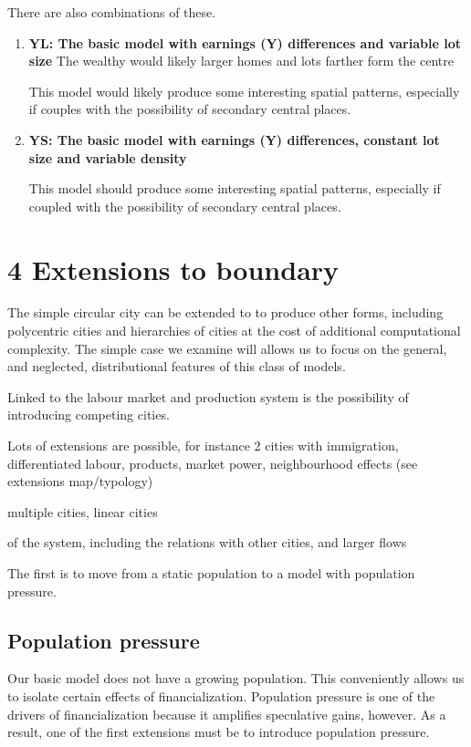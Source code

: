 There are also combinations of these.

\begin{enumerate}

\item \textbf{YL: The basic model with earnings (Y) differences and variable lot size}
The wealthy would likely larger homes and lots farther form the centre

This model would likely produce some interesting spatial patterns, especially if couples with the possibility of secondary central places.

\item \textbf{YS: The basic model with earnings (Y) differences, constant lot size and variable density}

This model should produce some interesting spatial patterns, especially if coupled with the possibility of secondary central places.

\end{enumerate}


\section{4 Extensions to boundary} %
The simple circular city can be extended to to produce other forms, including polycentric cities and hierarchies of cities at the cost of additional computational complexity. The simple case we examine will allows us to focus on the general, and neglected, distributional features of this class of models.

Linked to the labour market and production system is the possibility of introducing competing cities. 

Lots of  extensions are possible, for instance 2 cities with immigration, differentiated labour, products, market power, neighbourhood effects (see extensions map/typology)

multiple cities,
linear cities

 of the system, including the relations with other cities, and larger flows


The first is to move from a static population to a model with population pressure. %

\subsection{Population pressure} 
Our basic model does not have a growing population. This conveniently allows us to isolate certain effects of financialization. Population pressure is one of the drivers of financialization because it amplifies speculative gains, however. As a result, one of the first extensions must be  to introduce population pressure.

